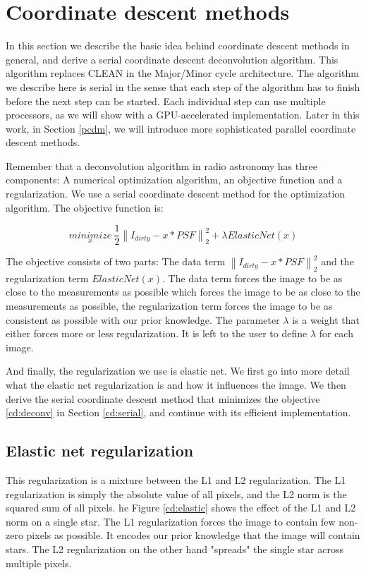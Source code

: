 \section{Coordinate descent methods}
In this section we describe the basic idea behind coordinate descent methods in general, and derive a serial coordinate descent deconvolution algorithm. This algorithm replaces CLEAN in the Major/Minor cycle architecture. The algorithm we describe here is serial in the sense that each step of the algorithm has to finish before the next step can be started. Each individual step can use multiple processors, as we will show with a GPU-accelerated implementation. Later in this work, in Section \ref{pcdm}, we will introduce more sophisticated parallel coordinate descent methods.

Remember that a deconvolution algorithm in radio astronomy has three components: A numerical optimization algorithm, an objective function and a regularization. We use a serial coordinate descent method for the optimization algorithm. The objective function is:

\begin{equation}\label{cd:deconv}
\underset{x}{minimize} \: \frac{1}{2} \left \| I_{dirty} - x * PSF \right \|_2^2 + \lambda ElasticNet(x)
\end{equation}

The objective consists of two parts: The data term $\left \| I_{dirty} - x * PSF \right \|_2^2$ and the regularization term $ElasticNet(x)$. The data term forces the image to be as close to the measurements as possible which forces the image to be as close to the measurements as possible, the regularization term forces the image to be as consistent as possible with our prior knowledge. The parameter $\lambda$ is a weight that either forces more or less regularization. It is left to the user to define $\lambda$ for each image. 

And finally, the regularization we use is elastic net. We first go into more detail what the elastic net regularization is and how it influences the image. We then derive the serial coordinate descent method that minimizes the objective \eqref{cd:deconv} in Section \ref{cd:serial}, and continue with its efficient implementation.


\subsection{Elastic net regularization} \label{cd:reg}
This regularization is a mixture between the L1 and L2 regularization.  The L1 regularization is simply the absolute value of all pixels, and the L2 norm is the squared sum of all pixels. he Figure \ref{cd:elastic} shows the effect of the L1 and L2 norm on a single star. The L1 regularization forces the image to contain few non-zero pixels as possible. It encodes our prior knowledge that the image will contain stars. The L2 regularization on the other hand "spreads" the single star across multiple pixels. 

